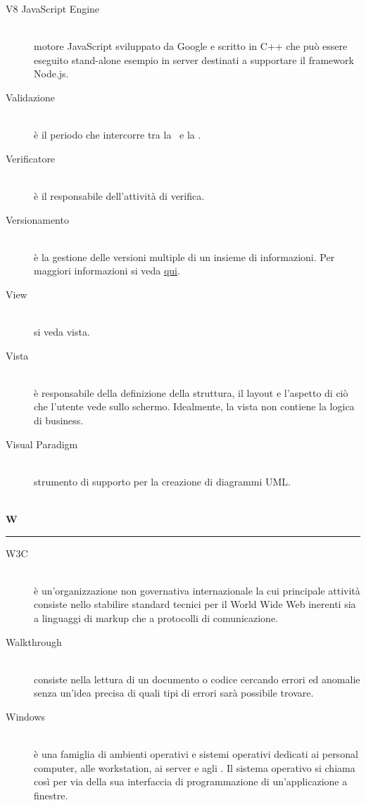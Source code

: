 \documentclass[12pt,a4paper]{article}
\begin{document}
\begin{description}
\item[V8 JavaScript Engine] 
\hfill\\motore JavaScript  sviluppato da Google e scritto in C++ che  può essere eseguito stand-alone esempio in server destinati a supportare il framework Node.js.

\item[Validazione] 
\hfill\\è il periodo che intercorre tra la \RQ\ e la \RA.

\item[Verificatore] 
\hfill\\è il responsabile dell'attività di verifica.

\item[Versionamento] 
\hfill\\è la gestione delle versioni multiple di un insieme di informazioni. Per maggiori informazioni si veda \href{http://it. wikipedia.org/wiki/Controllo_versione}{qui}.

\item[View] 
\hfill\\si veda vista.

\item[Vista] 
\hfill\\è responsabile della definizione della struttura, il layout e l'aspetto di ciò che l'utente vede sullo schermo. Idealmente, la vista non contiene la logica di business.

\item[Visual Paradigm] 
\hfill\\strumento di supporto per la creazione di diagrammi UML.
\end{description}

\newpage

\begin{center}
\hfill\\
	\LARGE \textbf{W}
\hfill\\
\rule[15pt]{30pt}{0.5pt}
\end{center}

\begin{description}
\item[W3C] 
\hfill\\è un'organizzazione non governativa internazionale la cui principale attività  consiste nello stabilire standard tecnici per il World Wide Web inerenti sia a linguaggi di markup che a protocolli di comunicazione.

\item[Walkthrough] 
\hfill\\consiste nella lettura di un documento o codice cercando errori ed anomalie senza un'idea precisa di quali tipi di errori sarà possibile trovare.

\item[Windows] 
\hfill\\è una famiglia di ambienti operativi e sistemi operativi dedicati ai personal computer, alle workstation, ai server e agli . Il sistema operativo si chiama così per via della sua interfaccia di programmazione di un'applicazione a finestre.
\end{description}
\end{document}
